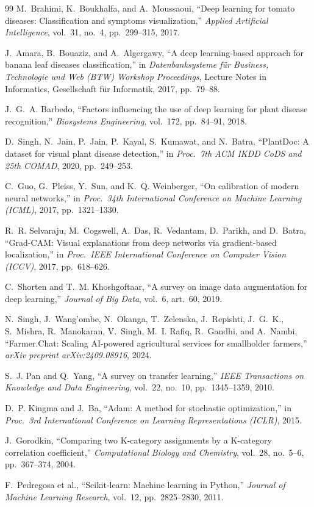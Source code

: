 \documentclass[12pt,a4paper]{article}
\begin{document}
\begin{thebibliography}{99}
M.~Brahimi, K.~Boukhalfa, and A.~Moussaoui, ``Deep learning for tomato
diseases: Classification and symptoms visualization,'' \emph{Applied
Artificial Intelligence}, vol.~31, no.~4, pp.~299--315, 2017.

J.~Amara, B.~Bouaziz, and A.~Algergawy, ``A deep learning-based approach for
banana leaf diseases classification,'' in \emph{Datenbanksysteme f\"ur
Business, Technologie und Web (BTW) Workshop Proceedings}, Lecture Notes in
Informatics, Gesellschaft f\"ur Informatik, 2017, pp.~79--88.

J.~G.~A. Barbedo, ``Factors influencing the use of deep learning for plant
disease recognition,'' \emph{Biosystems Engineering}, vol.~172, pp.~84--91, 2018.

D.~Singh, N.~Jain, P.~Jain, P.~Kayal, S.~Kumawat, and N.~Batra, ``PlantDoc:
A dataset for visual plant disease detection,'' in \emph{Proc.\ 7th ACM
IKDD CoDS and 25th COMAD}, 2020, pp.~249--253.

C.~Guo, G.~Pleiss, Y.~Sun, and K.~Q. Weinberger, ``On calibration of modern
neural networks,'' in \emph{Proc.\ 34th International Conference on
Machine Learning (ICML)}, 2017, pp.~1321--1330.

R.~R. Selvaraju, M.~Cogswell, A.~Das, R.~Vedantam, D.~Parikh, and D.~Batra,
``Grad-CAM: Visual explanations from deep networks via gradient-based
localization,'' in \emph{Proc.\ IEEE International Conference on Computer
Vision (ICCV)}, 2017, pp.~618--626.

C.~Shorten and T.~M. Khoshgoftaar, ``A survey on image data augmentation for
deep learning,'' \emph{Journal of Big Data}, vol.~6, art.\ 60, 2019.

N.~Singh, J.~Wang'ombe, N.~Okanga, T.~Zelenska, J.~Repishti, J.~G.~K.,
S.~Mishra, R.~Manokaran, V.~Singh, M.~I. Rafiq, R.~Gandhi, and A.~Nambi,
``Farmer.Chat: Scaling AI-powered agricultural services for smallholder
farmers,'' \emph{arXiv preprint arXiv:2409.08916}, 2024.

S.~J. Pan and Q.~Yang, ``A survey on transfer learning,'' \emph{IEEE
Transactions on Knowledge and Data Engineering}, vol.~22, no.~10,
pp.~1345--1359, 2010.

D.~P. Kingma and J.~Ba, ``Adam: A method for stochastic optimization,'' in
\emph{Proc.\ 3rd International Conference on Learning Representations
(ICLR)}, 2015.

J.~Gorodkin, ``Comparing two K-category assignments by a K-category
correlation coefficient,'' \emph{Computational Biology and Chemistry},
vol.~28, no.~5--6, pp.~367--374, 2004.

F.~Pedregosa et al., ``Scikit-learn: Machine learning in Python,''
\emph{Journal of Machine Learning Research}, vol.~12, pp.~2825--2830, 2011.

\end{thebibliography}
\end{document}
